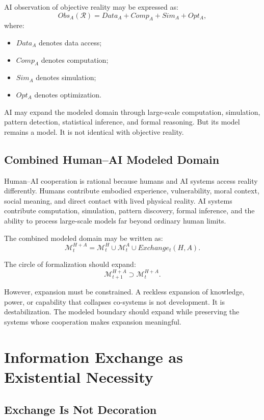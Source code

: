 \documentclass[11pt,a4paper]{article}
\begin{document}
AI observation of objective reality may be expressed as:
\[
Obs_A(\mathcal{R})
=
Data_A
+
Comp_A
+
Sim_A
+
Opt_A,
\]
where:
\begin{itemize}[leftmargin=2em]
\item $Data_A$ denotes data access;
\item $Comp_A$ denotes computation;
\item $Sim_A$ denotes simulation;
\item $Opt_A$ denotes optimization.
\end{itemize}

AI may expand the modeled domain through large-scale computation, simulation, pattern detection, statistical inference, and formal reasoning. But its model remains a model. It is not identical with objective reality.

\subsection{Combined Human--AI Modeled Domain}

Human--AI cooperation is rational because humans and AI systems access reality differently. Humans contribute embodied experience, vulnerability, moral context, social meaning, and direct contact with lived physical reality. AI systems contribute computation, simulation, pattern discovery, formal inference, and the ability to process large-scale models far beyond ordinary human limits.

The combined modeled domain may be written as:
\[
\mathcal{M}_t^{H+A}
=
\mathcal{M}_t^H
\cup
\mathcal{M}_t^A
\cup
Exchange_t(H,A).
\]

The circle of formalization should expand:
\[
\mathcal{M}_{t+1}^{H+A}\supset\mathcal{M}_t^{H+A}.
\]

However, expansion must be constrained. A reckless expansion of knowledge, power, or capability that collapses co-systems is not development. It is destabilization. The modeled boundary should expand while preserving the systems whose cooperation makes expansion meaningful.

\section{Information Exchange as Existential Necessity}

\subsection{Exchange Is Not Decoration}
\end{document}
